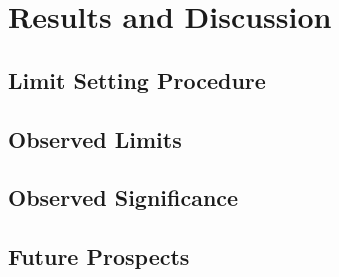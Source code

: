 \section{Results and Discussion}
\subsection{Limit Setting Procedure}
\subsection{Observed Limits}
\subsection{Observed Significance}
\subsection{Future Prospects}